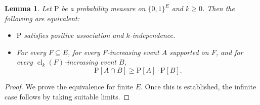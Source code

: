 \documentclass[11pt]{article}
\renewcommand{\P}{\mathrm{P}}
\DeclareMathOperator{\cl}{cl}
\newtheorem{lemma}{Lemma}
\theoremstyle{remark}
\begin{document}
\begin{lemma}\label{lem:positive-association-k-independence}
	Let $\P$ be a probability measure on  $\{0,1\}^E$ and $k\ge 0$. Then the following are equivalent:
	\begin{itemize}
		\item[(i)] $\P$ satisfies positive association and $k$-independence.
		\item[(ii)]  For every $F \subseteq E$, for every $F$-increasing event $A$ supported on $F$, and for every $\cl_k(F)$-increasing event $B$,
		\begin{equation}
			\P[A\cap B] \ge \P[A] \cdot \P[B].
		\end{equation}
	\end{itemize}
\end{lemma}
\begin{proof}
We prove the equivalence for finite $E$. Once this is established, the infinite case follows by taking suitable limits. 


\end{proof}
\end{document}
